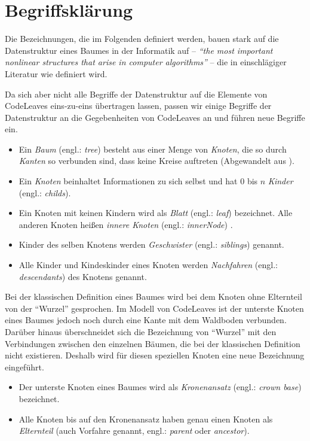 \section{Begriffsklärung}
\label{sec:naming}

Die Bezeichnungen, die im Folgenden definiert werden, bauen stark auf die Datenstruktur eines Baumes in der Informatik auf -- \textit{"`the most important nonlinear structures that arise in computer algorithms"'}\cite{knuth1973fundamental} -- die in einschlägiger Literatur wie \cite{knuth1973fundamental, ernst2016grundkurs, gumm2009einfuehrung} definiert wird.

Da sich aber nicht alle Begriffe der Datenstruktur auf die Elemente von CodeLeaves eins-zu-eins übertragen lassen, passen wir einige Begriffe der Datenstruktur an die Gegebenheiten von CodeLeaves an und führen neue Begriffe ein.

\begin{itemize}
  \item Ein \textit{Baum} (engl.: \textit{tree}) besteht aus einer Menge von \textit{Knoten}, die so durch \textit{Kanten} so verbunden sind, dass keine Kreise auftreten (Abgewandelt aus \cite{gumm2009einfuehrung, ernst2016grundkurs}).
  \item Ein \textit{Knoten} beinhaltet Informationen zu sich selbst und hat $0$ bis $n$ \textit{Kinder} (engl.: \textit{childs}).
  \item Ein Knoten mit keinen Kindern wird als \textit{Blatt} (engl.: \textit{leaf}) bezeichnet. Alle anderen Knoten heißen \textit{innere Knoten} (engl.: \textit{innerNode}) \cite{gumm2009einfuehrung}.
  \item Kinder des selben Knotens werden \textit{Geschwister} (engl.: \textit{siblings}) genannt.
  \item Alle Kinder und Kindeskinder eines Knoten werden \textit{Nachfahren} (engl.: \textit{descendants}) des Knotens genannt.
\end{itemize}

Bei der klassischen Definition eines Baumes wird bei dem Knoten ohne Elternteil von der "`Wurzel"' gesprochen. Im Modell von CodeLeaves ist der unterste Knoten eines Baumes jedoch noch durch eine Kante mit dem Waldboden verbunden. Darüber hinaus überschneidet sich die Bezeichnung von "`Wurzel"' mit den Verbindungen zwischen den einzelnen Bäumen, die bei der klassischen Definition nicht existieren. Deshalb wird für diesen speziellen Knoten eine neue Bezeichnung eingeführt. 

\begin{itemize}
  \item Der unterste Knoten eines Baumes wird als \textit{Kronenansatz} (engl.: \textit{crown base}) bezeichnet.
  \item Alle Knoten bis auf den Kronenansatz haben genau einen Knoten als \textit{Elternteil} (auch Vorfahre genannt, engl.: \textit{parent} oder \textit{ancestor}).
\end{itemize}

